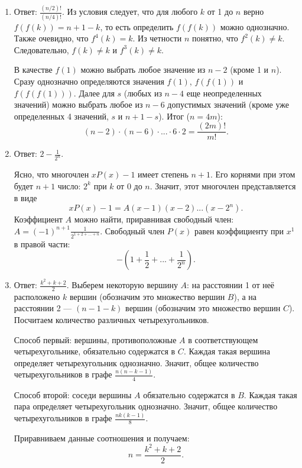 \begin{enumerate}
\item Ответ: $\frac{(n/2)!}{(n/4)!}$. Из условия следует, что для любого $k$ от 1 до $n$ верно $f(f(k)) = n + 1 - k$, то есть определить $f(f(k))$ можно однозначно. Также очевидно, что $f^4(k) = k$. Из четности $n$ понятно, что $f^2(k) \neq k$. Следовательно, $f(k) \neq k$ и $f^3(k) \neq k$. 

В качестве $f(1)$ можно выбрать любое значение из $n-2$ (кроме 1 и $n$). Сразу однозначно определяются значения $f(1)$, $f(f(1))$ и $f(f(f(1)))$. Далее для $s$ (любых из $n-4$ еще неопределенных значений) можно выбрать любое из $n-6$ допустимых значений (кроме уже определенных 4 значений, $s$ и $n+1-s$). Итог ($n = 4m$):
$$(n-2) \cdot  (n-6) \cdot  ... \cdot  6 \cdot 2 = \frac{(2m)!}{m!}.$$

\item Ответ: $2 - \frac{1}{2^n}$.

Ясно, что многочлен $x P(x) - 1$ имеет степень $n+1$. Его корнями при этом будет $n+1$ число: $2^k$ при $k$ от $0$ до $n$. Значит, этот многочлен представляется в виде 
$$x P(x) - 1 = A (x - 1) (x - 2) ... (x - 2^n).$$
Коэффициент $A$ можно найти, приравнивая свободный член: $A = (-1)^{n+1} \frac{1}{2^{1+2+...+n}}$. Свободный член $P(x)$ равен коэффициенту при $x^1$ в правой части:
$$ - \left(1 + \frac{1}{2} + ... + \frac{1}{2^n} \right).$$

\item Ответ: $\frac{k^2 + k + 2}{2}$. Выберем некоторую вершину $A$: на расстоянии 1 от неё расположено $k$ вершин (обозначим это множество вершин $B$), а на расстоянии 2 ---  $(n - 1 - k)$ вершин (обозначим это множество вершин $C$). Посчитаем количество различных четырехугольников. 

Способ первый: вершины, противоположные $A$ в соответствующем четырехугольнике, обязательно содержатся в $C$. Каждая такая вершина определяет четырехугольник однозначно. Значит, общее количество четырехугольников в графе $\frac{n(n-k-1)}{4}$.

Способ второй: соседи вершины $A$ обязательно содержатся в $B$. Каждая такая пара определяет четырехугольник однозначно. Значит, общее количество четырехугольников в графе $\frac{nk(k-1)}{8}$.

Приравниваем данные соотношения и получаем:
$$n = \frac{k^2 + k + 2}{2}.$$

\end{enumerate}
